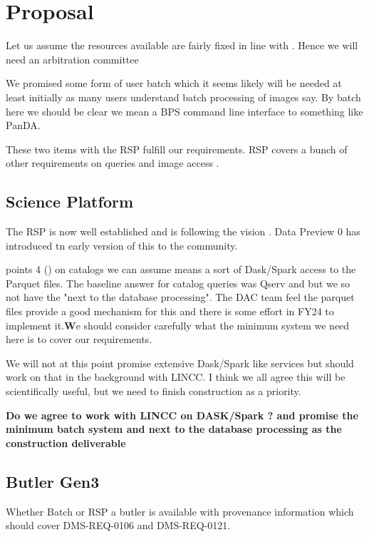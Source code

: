 \section{Proposal} \label{sec:proposal}

Let us assume the resources available are fairly fixed in line with .
Hence we will need an arbitration committee 

We promised some form of user batch which it seems likely will be needed at least initially as many users understand batch processing of images say. By batch here we should be clear we mean a BPS command line interface to something like PanDA. 

These two items with the RSP fulfill our requirements.  RSP covers a bunch of other requirements on queries and image access .


\subsection{Science Platform}\label{sec:rsp}
The RSP is now well established and is following the vision .
Data Preview 0 has introduced tn early version of this to the community.

 points 4 () on catalogs we can assume means a sort of Dask/Spark access to the Parquet files.  The baseline answer for catalog queries  was Qserv and but we so not have the "next to the database processing". The DAC team feel the parquet files provide a good mechanism for this and there is some effort in FY24 to implement it.{\textbf We should consider carefully what the minimum system we need here is to cover our requirements.}

We will not at this point promise extensive Dask/Spark like services but should work on that in the background with LINCC. I think we all agree this will be scientifically useful, but we need to finish construction as a priority.

\textbf{Do we agree to work with LINCC on DASK/Spark ? and promise the minimum batch system and next to the database processing  as the construction deliverable}

\subsection{Butler Gen3}

Whether Batch or RSP a butler is available with provenance information which should cover DMS-REQ-0106 and DMS-REQ-0121.

